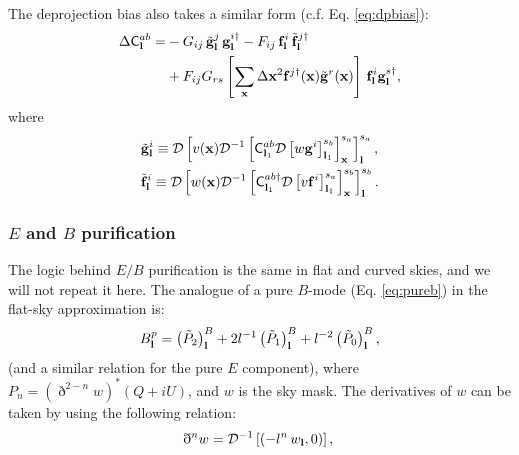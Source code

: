 \documentclass[usenatbib]{mnrasb}
\begin{document}
        The deprojection bias also takes a similar form (c.f. Eq. \ref{eq:dpbias}):
        \begin{align}\nonumber
          \Delta{\sf C}^{ab}_{\bf l}=&-G_{ij}\,\tilde{\bf g}^j_{\bf l}\,{\bf g}^{i\dag}_{\bf l}-F_{ij}\,{\bf f}^i_{\bf l}\,\tilde{\bf f}^{j\dag}_{\bf l}\\\label{eq:dpbias_flat}
          &+F_{ij}G_{rs}\left[\sum_{\bf x}\Delta{\bf x}^2{\bf f}^{j\dag}({\bf x})\tilde{\bf g}^r({\bf x})\right]\,{\bf f}^i_{\bf l}{\bf g}^{s\dag}_{\bf l},
        \end{align}
        where
        \begin{align}\label{eq:dp.g.aux_flat}
          &\tilde{\bf g}^i_{\bf l}\equiv{\cal D}\left[v({\bf x}){\cal D}^{-1}\left[{\sf C}^{ab}_{{\bf l}_1}{\cal D}\left[w{\bf g}^i\right]^{s_b}_{{\bf l}_1}\right]^{s_a}_{\bf x}\right]^{s_a}_{\bf l},\\\label{eq:dp.f.aux_flat}
          &\tilde{\bf f}^i_{\bf l}\equiv{\cal D}\left[w({\bf x}){\cal D}^{-1}\left[{\sf C}^{ab\dag}_{{\bf l}_1}{\cal D}\left[v{\bf f}^i\right]^{s_a}_{{\bf l}_1}\right]^{s_b}_{\bf x}\right]^{s_b}_{\bf l}.
        \end{align}

      \subsubsection{$E$ and $B$ purification}\label{sssec:maths.flat.pureb}
        The logic behind $E/B$ purification is the same in flat and curved skies, and we will not repeat it here. The analogue of a pure $B$-mode (Eq. \ref{eq:pureb}) in the flat-sky approximation is:
        \begin{equation}
          B^p_{\bf l}=\left(\tilde{P}_2\right)^B_{\bf l}+2l^{-1}\left(\tilde{P}_1\right)^B_{\bf l}+l^{-2}\left(\tilde{P}_0\right)^B_{\bf l},
        \end{equation}
        (and a similar relation for the pure $E$ component), where $P_n=(\eth^{2-n}w)^*(Q+iU)$, and $w$ is the sky mask. The derivatives of $w$ can be taken by using the following relation:
        \begin{equation}
          \eth^nw={\cal D}^{-1}\left[\left(-l^n\,w_{\bf l},0\right)\right],\\
        \end{equation}
    
\end{document}
